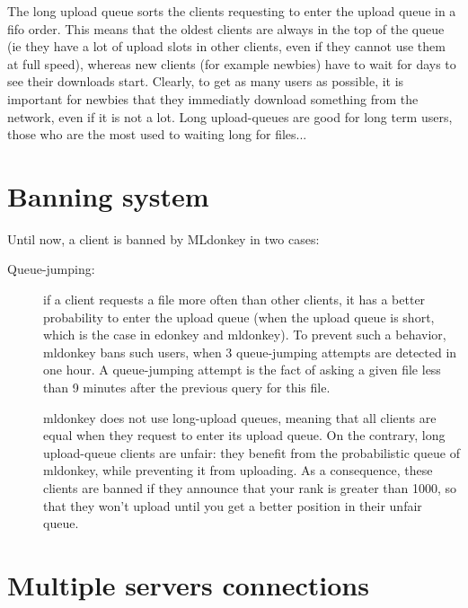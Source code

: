 \documentclass{article}
\begin{document}
 The long upload queue sorts the clients requesting to enter the upload
queue in a fifo order. This means that the oldest clients are always in the
top of the queue (ie they have a lot of upload slots in other clients, even
if they cannot use them at full speed), whereas new clients (for example
newbies) have to wait for days to see their downloads start. Clearly, 
to get as many users as possible, it is important for newbies that they 
immediatly download something from the network, even if it is not a lot.
Long upload-queues are good for long term users, those who are the most used
to waiting long for files...

\section{Banning system}

Until now, a client is banned by MLdonkey in two cases:

\begin{description}

 \item[Queue-jumping:] if a client requests a file more often than other
clients, it has a better probability to enter the upload queue (when the
upload queue is short, which is the case in edonkey and mldonkey). To prevent
such a behavior, mldonkey bans such users, when 3 queue-jumping attempts are
detected in one hour. A queue-jumping attempt is the fact of asking a given file less than 9 minutes after the previous query for this file.

  mldonkey does not use long-upload queues,
meaning that all clients are equal when they request to enter its upload
queue. On the contrary, long upload-queue clients are unfair: they benefit
from the probabilistic queue of mldonkey, while preventing it from uploading.
As a consequence, these clients are banned if they announce that your rank is
greater than 1000, so that they won't upload until you get a better position
in their unfair queue.

\end{description}

\section{Multiple servers connections}
\end{document}
